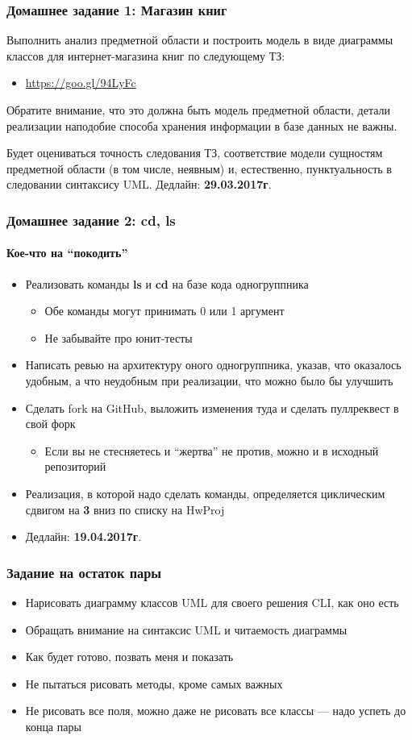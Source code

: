 \documentclass[xetex,mathserif,serif]{beamer}
\begin{document}
	\begin{frame}
		\frametitle{Домашнее задание 1: Магазин книг}
		Выполнить анализ предметной области и построить модель в виде диаграммы классов для интернет-магазина книг по следующему ТЗ:
		\begin{itemize}
			\item \url{https://goo.gl/94LyFc}
		\end{itemize}

		Обратите внимание, что это должна быть модель предметной области, детали реализации наподобие способа хранения информации в базе данных не важны.

		Будет оцениваться точность следования ТЗ, соответствие модели сущностям предметной области (в том числе, неявным) и, естественно, пунктуальность в следовании синтаксису UML.
		\bigskip
		Дедлайн: \textbf{29.03.2017г}.
	\end{frame}

	\begin{frame}
		\frametitle{Домашнее задание 2: cd, ls}
		\framesubtitle{Кое-что на ``покодить''}
		\begin{itemize}
			\item Реализовать команды \textbf{ls} и \textbf{cd} на базе кода одногруппника
			\begin{itemize}
				\item Обе команды могут принимать 0 или 1 аргумент
				\item Не забывайте про юнит-тесты
			\end{itemize}
			\item Написать ревью на архитектуру оного одногруппника, указав, что оказалось удобным, а что неудобным при реализации, что можно было бы улучшить
			\item Сделать fork на GitHub, выложить изменения туда и сделать пуллреквест в свой форк
			\begin{itemize}
				\item Если вы не стесняетесь и ``жертва'' не против, можно и в исходный репозиторий
			\end{itemize}
			\item Реализация, в которой надо сделать команды, определяется циклическим сдвигом на \textbf{3} вниз по списку на HwProj
			\item Дедлайн: \textbf{19.04.2017г}.
		\end{itemize}
	\end{frame}

	\begin{frame}
		\frametitle{Задание на остаток пары}
		\begin{itemize}
			\item Нарисовать диаграмму классов UML для своего решения CLI, как оно есть
			\item Обращать внимание на синтаксис UML и читаемость диаграммы
			\item Как будет готово, позвать меня и показать
			\item Не пытаться рисовать методы, кроме самых важных
			\item Не рисовать все поля, можно даже не рисовать все классы --- надо успеть до конца пары
		\end{itemize}
	\end{frame}
\end{document}

